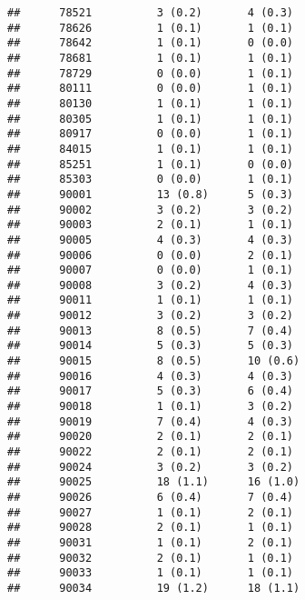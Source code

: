 \documentclass[]{article}
\begin{document}
\begin{verbatim}
##      78521          3 (0.2)       4 (0.3)                       
##      78626          1 (0.1)       1 (0.1)                       
##      78642          1 (0.1)       0 (0.0)                       
##      78681          1 (0.1)       1 (0.1)                       
##      78729          0 (0.0)       1 (0.1)                       
##      80111          0 (0.0)       1 (0.1)                       
##      80130          1 (0.1)       1 (0.1)                       
##      80305          1 (0.1)       1 (0.1)                       
##      80917          0 (0.0)       1 (0.1)                       
##      84015          1 (0.1)       1 (0.1)                       
##      85251          1 (0.1)       0 (0.0)                       
##      85303          0 (0.0)       1 (0.1)                       
##      90001          13 (0.8)      5 (0.3)                       
##      90002          3 (0.2)       3 (0.2)                       
##      90003          2 (0.1)       1 (0.1)                       
##      90005          4 (0.3)       4 (0.3)                       
##      90006          0 (0.0)       2 (0.1)                       
##      90007          0 (0.0)       1 (0.1)                       
##      90008          3 (0.2)       4 (0.3)                       
##      90011          1 (0.1)       1 (0.1)                       
##      90012          3 (0.2)       3 (0.2)                       
##      90013          8 (0.5)       7 (0.4)                       
##      90014          5 (0.3)       5 (0.3)                       
##      90015          8 (0.5)       10 (0.6)                      
##      90016          4 (0.3)       4 (0.3)                       
##      90017          5 (0.3)       6 (0.4)                       
##      90018          1 (0.1)       3 (0.2)                       
##      90019          7 (0.4)       4 (0.3)                       
##      90020          2 (0.1)       2 (0.1)                       
##      90022          2 (0.1)       2 (0.1)                       
##      90024          3 (0.2)       3 (0.2)                       
##      90025          18 (1.1)      16 (1.0)                      
##      90026          6 (0.4)       7 (0.4)                       
##      90027          1 (0.1)       2 (0.1)                       
##      90028          2 (0.1)       1 (0.1)                       
##      90031          1 (0.1)       2 (0.1)                       
##      90032          2 (0.1)       1 (0.1)                       
##      90033          1 (0.1)       1 (0.1)                       
##      90034          19 (1.2)      18 (1.1)                      

\end{verbatim}
\end{document}
